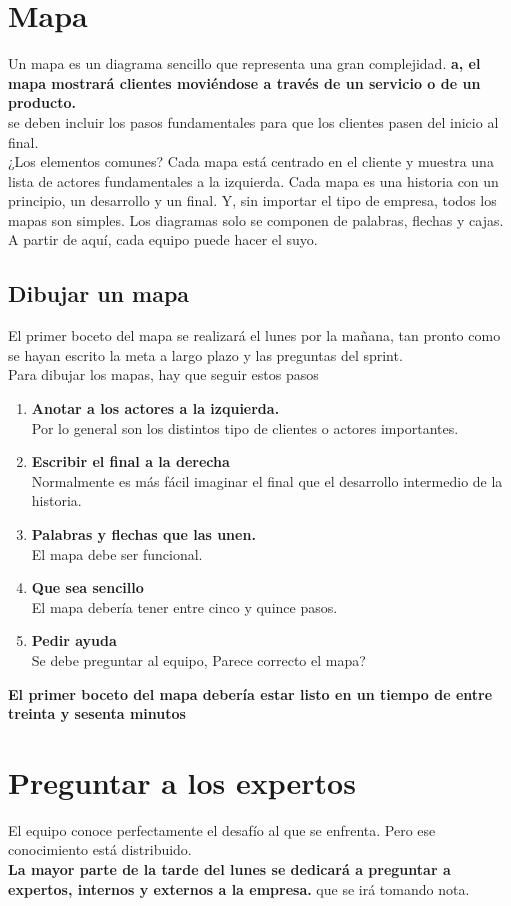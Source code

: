 \documentclass[10pt]{article}
\begin{document}
\begin{multicols}{2}
\section*{Mapa}
Un mapa es un diagrama sencillo que representa una gran complejidad. \textbf{a, el mapa mostrará clientes moviéndose a través de un servicio o de un producto.}\\
se deben incluir los pasos fundamentales para que los clientes pasen del inicio al final.\\
¿Los elementos comunes? Cada mapa está centrado en el cliente y muestra una lista de actores fundamentales a la izquierda. Cada mapa es una historia con un principio, un desarrollo y un final. Y, sin importar el tipo de empresa, todos los mapas son simples. Los diagramas solo se componen de palabras, flechas y cajas. A partir de aquí, cada equipo puede hacer el suyo.
\subsection*{Dibujar un mapa}
El primer boceto del mapa se realizará el lunes por la mañana, tan pronto como se hayan escrito la meta a largo plazo y las preguntas del sprint.\\
Para dibujar los mapas, hay que seguir estos pasos
\begin{enumerate}[\bfseries 1.]
\item \textbf{Anotar a los actores a la izquierda.}\\
Por lo general son los distintos tipo de clientes o actores importantes.
\item \textbf{Escribir el final a la derecha}\\
Normalmente es más fácil imaginar el final que el desarrollo intermedio de la historia.
\item \textbf{Palabras y flechas que las unen.}\\
El mapa debe ser funcional.
\item \textbf{Que sea sencillo}\\
El mapa debería tener entre cinco y quince pasos.
\item \textbf{Pedir ayuda}\\
Se debe preguntar al equipo, Parece correcto el mapa?
\end{enumerate}
\textbf{El primer boceto del mapa debería estar listo en un tiempo de entre treinta y sesenta minutos}
\section*{Preguntar a los expertos}
El equipo conoce perfectamente el desafío al que se enfrenta. Pero ese conocimiento está distribuido.\\
\textbf{La mayor parte de la tarde del lunes se dedicará a preguntar a expertos, internos y externos a la empresa.} que se irá tomando nota.

\end{multicols}
\end{document}
